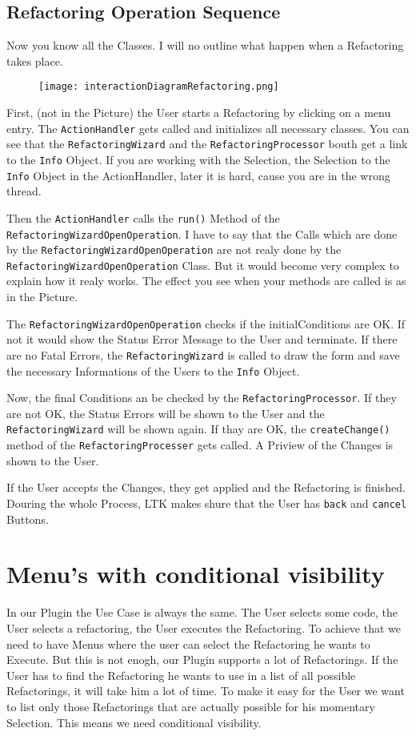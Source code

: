 \documentclass[a4paper,10pt]{report}
\begin{document}
\section{Refactoring Operation Sequence}
Now you know all the Classes. I will no outline what happen when a Refactoring takes place. 
\begin{figure}[h]
\centering
\texttt{[image: interactionDiagramRefactoring.png]}
\end{figure}
First, (not in the Picture) the User starts a Refactoring by clicking on a menu entry. The \verb!ActionHandler! gets called and initializes all necessary classes.
You can see that the \verb!RefactoringWizard! and the \verb!RefactoringProcessor! bouth get a link to the \verb!Info! Object. If you are working with the Selection, 
the Selection to the \verb!Info! Object in the ActionHandler, later it is hard, cause you are in the wrong thread.

Then the \verb!ActionHandler! calls the \verb!run()! Method of the \verb!RefactoringWizardOpenOperation!. I have to say that the Calls which are done by the
\verb!RefactoringWizardOpenOperation! are not realy done by the \verb!RefactoringWizardOpenOperation! Class. But it would become very complex to explain how it realy works.
The effect you see when your methods are called is as in the Picture.

The \verb!RefactoringWizardOpenOperation! checks if the initialConditions are OK. If not it would show the Status Error Message to the User and terminate. If there
are no Fatal Errors, the \verb!RefactoringWizard! is called to draw the form and save the necessary Informations of the Users to the \verb!Info! Object.

Now, the final Conditions an be checked by the \verb!RefactoringProcessor!. If they are not OK, the Status Errors will be shown to the User and the \verb!RefactoringWizard!
will be shown again. If thay are OK, the \verb!createChange()! method of the \verb!RefactoringProcesser! gets called. A Priview of the Changes is shown to the User.

If the User accepts the Changes, they get applied and the Refactoring is finished. Douring the whole Process, LTK makes shure that the User has \verb!back! and \verb!cancel! Buttons.


\chapter{Menu's with conditional visibility}
In our Plugin the Use Case is always the same. The User selects some code, the User selects a refactoring, the User executes the Refactoring. To achieve that we need to have Menus where the user can select the Refactoring he wants to Execute.
But this is not enogh, our Plugin supports a lot of Refactorings. If the User has to find the Refactoring he wants to use in a list of all possible Refactorings, it will take him a lot of time.
To make it easy for the User we want to list only those Refactorings that are actually possible for his momentary Selection. This means we need conditional visibility.
\end{document}
